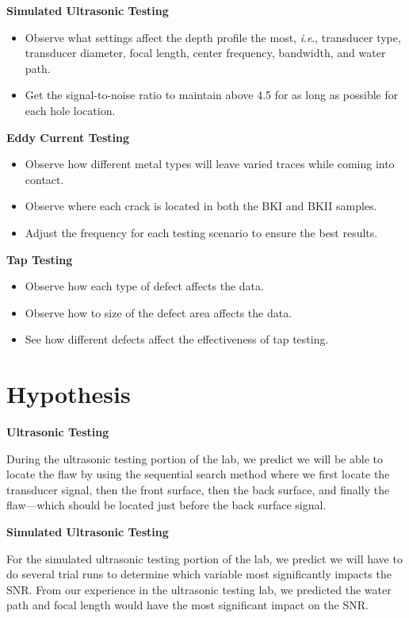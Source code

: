 \documentclass[12 pt]{report}
\newcommand{\ie}{\textit{i}.\textit{e}., }
\begin{document}
\textbf{Simulated Ultrasonic Testing}
\begin{itemize}
	\item Observe what settings affect the depth profile the most, \ie transducer type, transducer diameter, focal length, center frequency, bandwidth, and water path.
	\item Get the signal-to-noise ratio to maintain above \num{4.5} for as long as possible for each hole location.
\end{itemize}     

\textbf{Eddy Current Testing}
\begin{itemize}
	\item Observe how different metal types will leave varied traces while coming into contact.
	\item Observe where each crack is located in both the BKI and BKII samples.
	\item Adjust the frequency for each testing scenario to ensure the best results.
\end{itemize}

\textbf{Tap Testing}
\begin{itemize}
	\item Observe how each type of defect affects the data.
	\item Observe how to size of the defect area affects the data.
	\item See how different defects affect the effectiveness of tap testing.
\end{itemize}

\section{Hypothesis} \label{hypothesis}
\textbf{Ultrasonic Testing}

During the ultrasonic testing portion of the lab, we predict we will be able to locate the flaw by using the sequential search method where we first locate the transducer signal, then the front surface, then the back surface, and finally the flaw---which should be located just before the back surface signal.

\textbf{Simulated Ultrasonic Testing}

For the simulated ultrasonic testing portion of the lab, we predict we will have to do several trial runs to determine which variable most significantly impacts the SNR. From our experience in the ultrasonic testing lab, we predicted the water path and focal length would have the most significant impact on the SNR.
\end{document}
